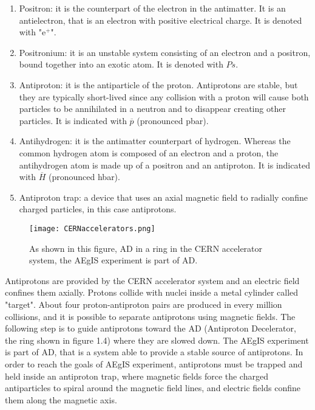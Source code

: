 \begin{enumerate}

\item Positron: it is the counterpart of the electron in the antimatter. It is an antielectron, that is an electron with positive electrical charge. It is denoted with "e$^{+}$".

\item Positronium: it is an unstable system consisting of an electron and a positron, bound together into an exotic atom. It is denoted with $ {Ps} $.

\item Antiproton: it is the antiparticle of the proton. Antiprotons are stable, but they are typically short-lived since any collision with a proton will cause both particles to be annihilated in a neutron and to disappear creating other particles. It is indicated with $ \overline{p} $ (pronounced pbar).

\item Antihydrogen: it is the antimatter counterpart of hydrogen. Whereas the common hydrogen atom is composed of an electron and a proton, the antihydrogen atom is made up of a positron and an antiproton. It is indicated with $ \overline{H} $ (pronounced hbar).


\item Antiproton trap: a device that uses an axial magnetic field to radially confine charged particles, in this case antiprotons.


\end{enumerate}

\begin{figure}[H]
\centering
\texttt{[image: CERNaccelerators.png]} 
\caption{ As shown in this figure, AD in a ring in the CERN accelerator system, the AEgIS experiment is part of AD. }
\end{figure}


Antiprotons are provided by the CERN accelerator system and an electric field confines them axially. 
Protons collide with nuclei inside a metal cylinder called "target". About four proton-antiproton pairs are produced in every million collisions, and it is possible to separate antiprotons using magnetic fields. The following step is to guide antiprotons toward the AD (Antiproton Decelerator, the ring shown in figure 1.4) where they are slowed down. 
The AEgIS experiment is part of AD, that is a system able to provide a stable source of antiprotons.
In order to reach the goals of AEgIS experiment, antiprotons must be trapped and held inside an antiproton trap, where magnetic fields force the charged antiparticles to spiral around the magnetic field lines, and electric fields confine them along the magnetic axis.

